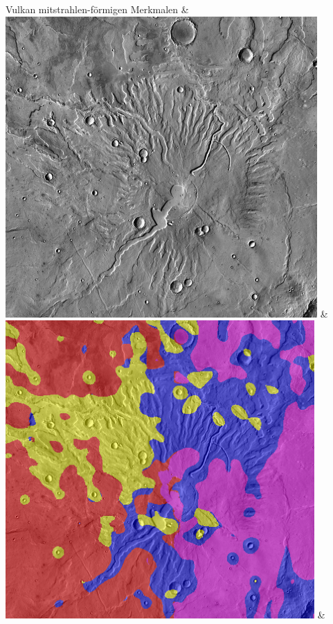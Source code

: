 \begin{table}[h!]
\begin{tabularx}{\textwidth}
		Vulkan mit\newline strahlen-\newline förmigen Merkmalen &
		\includegraphics[width=.9\linewidth]{images/Gre13/Gre13_03.jpg} &
		\includegraphics[width=.9\linewidth]{images/gen/filterbanks/Gre13_03.jpg_TSUGF.png} &

\end{tabularx}
\end{table}
